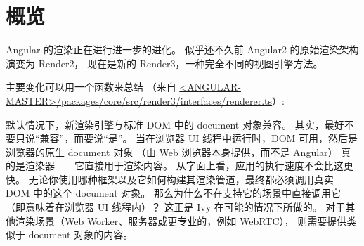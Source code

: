 \section{概览}


Angular 的渲染正在进行进一步的进化。
似乎还不久前 Angular2 的原始渲染架构演变为 Render2，
现在是新的 Render3，一种完全不同的视图引擎方法。


主要变化可以用一个函数来总结
（来自
\href{https://github.com/angular/angular/blob/master/packages/core/src/render3/interfaces/renderer.ts}
{<ANGULAR-MASTER>/packages/core/src/render3/interfaces/renderer.ts}）:




默认情况下，新渲染引擎与标准 DOM 中的 document 对象兼容。
其实，最好不要只说“兼容”，而要说“是”。
当在浏览器 UI 线程中运行时，DOM 可用，然后是浏览器的原生 document 对象
（由 Web 浏览器本身提供，而不是 Angular）
真的是渲染器——它直接用于渲染内容。
从字面上看，应用的执行速度不会比这更快。
无论你使用哪种框架以及它如何构建其渲染管道，最终都必须调用真实 DOM 中的这个 document 对象。
那么为什么不在支持它的场景中直接调用它（即意味着在浏览器 UI 线程内）？
这正是 Ivy 在可能的情况下所做的。
对于其他渲染场景（Web Worker、服务器或更专业的，例如 WebRTC），
则需要提供类似于 document 对象的内容。

